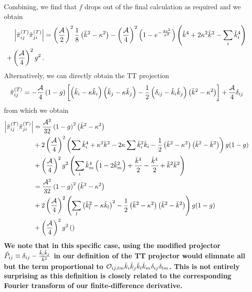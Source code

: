 \documentclass{revtex4}
\begin{document}
Combining, we find that $f$ drops out of the final calculation as required and we obtain
\begin{align}
  \left|\tilde{\pi}^{(T)}_{ij}\tilde{\pi}_{ji}^{(T)}\right| &= \left(\frac{\mathcal{A}}{2}\right)^2\frac{1}{8}\left(\tilde{k}^2-\kappa^2\right)
  - \left(\frac{\mathcal{A}}{4}\right)^2\left(1-e^{-\frac{dx^2}{\sigma^2}}\right)\left(\tilde{k}^4+2\kappa^2\tilde{k}^2-\sum_i\tilde{k}_i^4\right) \notag \\
  + \left(\frac{\mathcal{A}}{4}\right)^2g^2 \, .
\end{align}
Alternatively, we can directly obtain the TT projection
\begin{equation}
  \tilde{\pi}_{ij}^{(T)} = -\frac{\mathcal{A}}{4}\left(1-g\right)\left[\left(\tilde{k}_i-\kappa\hat{k}_i\right)\left(\tilde{k}_j-\kappa\hat{k}_j\right) - \frac{1}{2}\left(\delta_{ij}-\hat{k}_i\hat{k}_j\right)\left(\tilde{k}^2-\kappa^2\right)\right] + \frac{\mathcal{A}}{4}\delta_{ij}
\end{equation}
from which we obtain
\begin{align}
  \left|\tilde{\pi}^{(T)}_{ij}\tilde{\pi}_{ji}^{(T)}\right| &= \frac{\mathcal{A}^2}{32}\left(1-g\right)^2\left(\tilde{k}^2-\kappa^2\right) \notag \\
  &+ 2\left(\frac{\mathcal{A}}{4}\right)^2\left(\sum\tilde{k}_i^4 + \kappa^2\bar{k}^2 - 2\kappa\sum\tilde{k}_i^2\bar{k}_i - \frac{1}{2}\left(\tilde{k}^2-\kappa^2\right)\left(\tilde{k}^2-\bar{k}^2\right) \right)g(1-g) \\
  &+ \left(\frac{\mathcal{A}}{4}\right)^2g^2\left(\sum_i\tilde{k}_m^4\left(1-2\hat{k}_m^2\right) + \frac{\bar{k}^4}{2} - \frac{\tilde{k}^4}{2} + \tilde{k}^2\bar{k}^2\right) \notag \\
  &= \frac{\mathcal{A}^2}{32}\left(1-g\right)^2\left(\tilde{k}^2-\kappa^2\right) \notag \\
  &+ 2\left(\frac{\mathcal{A}}{4}\right)^2\left(\sum_l\left(\tilde{k}_l^2-\kappa\bar{k}_l\right)^2 - \frac{1}{2}\left(\tilde{k}^2-\kappa^2\right)\left(\tilde{k}^2-\bar{k}^2\right) \right)g(1-g) \notag \\
  &+ \left(\frac{\mathcal{A}}{4}\right)^2g^2\left(\right)
\end{align}
{\bf We note that in this specific case, using the modified projector $\tilde{P}_{ij}\equiv \delta_{ij} - \frac{\tilde{k}_i\tilde{k}_j}{\tilde{k}^2}$ in our definition of the TT projector would elimnate all but the term proportional to $\mathcal{O}_{ij,lm}\tilde{k}_i\tilde{k}_j\tilde{k}_l\tilde{k}_m\delta_{ij}\delta_{lm}$.  This is not entirely surprising as this definition is closely related to the corresponding Fourier transform of our finite-difference derivative.}
\end{document}
